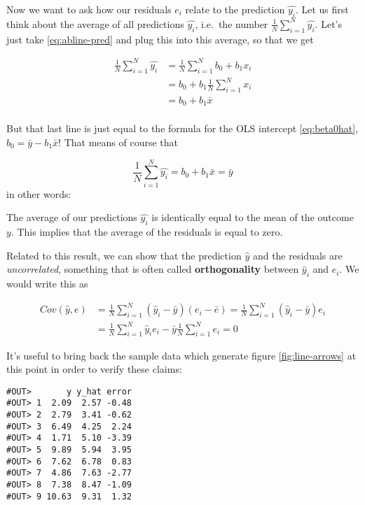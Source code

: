 \documentclass[]{book}
\newenvironment{tip}{\begin{tcolorbox}[colback=green!5!white,colframe=green]}{\end{tcolorbox}}
\begin{document}
Now we want to ask how our residuals \(e_i\) relate to the prediction \(\hat{y_i}\). Let us first think about the average of all predictions \(\hat{y_i}\), i.e.~the number \(\frac{1}{N} \sum_{i=1}^N \hat{y_i}\). Let's just take \eqref{eq:abline-pred} and plug this into this average, so that we get

\begin{align}
\frac{1}{N} \sum_{i=1}^N \hat{y_i} &= \frac{1}{N} \sum_{i=1}^N b_0 + b_1 x_i \\
&= b_0 + b_1  \frac{1}{N} \sum_{i=1}^N x_i \\
&= b_0 + b_1  \bar{x} \\
\end{align}

But that last line is just equal to the formula for the OLS intercept \eqref{eq:beta0hat}, \(b_0 = \bar{y} - b_1 \bar{x}\)! That means of course that

\[
\frac{1}{N} \sum_{i=1}^N \hat{y_i}  = b_0 + b_1  \bar{x} = \bar{y}
\]
in other words:

\begin{tip}
The average of our predictions \(\hat{y_i}\) is identically equal to the
mean of the outcome \(y\). This implies that the average of the
residuals is equal to zero.
\end{tip}

Related to this result, we can show that the prediction \(\hat{y}\) and the residuals are \emph{uncorrelated}, something that is often called \textbf{orthogonality} between \(\hat{y}_i\) and \(e_i\). We would write this as

\begin{align}
Cov(\hat{y},e) &=\frac{1}{N} \sum_{i=1}^N (\hat{y}_i-\bar{y})(e_i-\bar{e}) =   \frac{1}{N} \sum_{i=1}^N (\hat{y}_i-\bar{y})e_i \\
&=  \frac{1}{N} \sum_{i=1}^N \hat{y}_i e_i-\bar{y} \frac{1}{N} \sum_{i=1}^N e_i = 0
\end{align}

It's useful to bring back the sample data which generate figure \ref{fig:line-arrows} at this point in order to verify these claims:

\begin{verbatim}
#OUT>       y y_hat error
#OUT> 1  2.09  2.57 -0.48
#OUT> 2  2.79  3.41 -0.62
#OUT> 3  6.49  4.25  2.24
#OUT> 4  1.71  5.10 -3.39
#OUT> 5  9.89  5.94  3.95
#OUT> 6  7.62  6.78  0.83
#OUT> 7  4.86  7.63 -2.77
#OUT> 8  7.38  8.47 -1.09
#OUT> 9 10.63  9.31  1.32
\end{verbatim}
\end{document}
